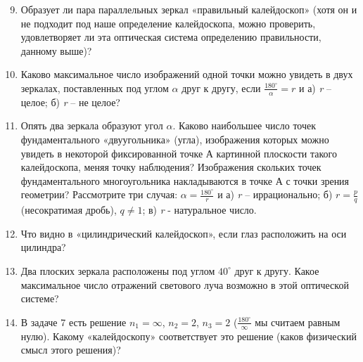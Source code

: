 \begin{minipage}{0.6\textwidth}
\begin{enumerate}
        \setcounter{enumi}{8}
        \item Образует ли пара параллельных зеркал «правильный калейдоскоп» (хотя он и не подходит под наше определение калейдоскопа, можно проверить, удовлетворяет ли эта оптическая система определению правильности, данному выше)?
        \item Каково максимальное число изображений одной точки можно увидеть в двух зеркалах, поставленных под углом $\alpha$ друг к другу, если $\frac{180^\circ}{\alpha} = r$ и а) \textit{r} -- целое; б) \textit{r} -- не целое?
        \item Опять два зеркала образуют угол $\alpha$. Каково наибольшее число точек фундаментального «двуугольника» (угла), изображения которых можно увидеть в некоторой фиксированной точке А картинной плоскости такого калейдоскопа, меняя точку наблюдения? Изображения скольких точек фундаментального многоугольника накладываются в точке А с точки зрения геометрии? Рассмотрите три случая: $\alpha = \frac{180^\circ}{r}$ и а) \textit{r} -- иррационально; б) $r= \frac{p}{q}$ (несократимая дробь), $q \neq 1$; в) \textit{r} - натуральное число.
        \item Что видно в «цилиндрический калейдоскоп», если глаз расположить на оси цилиндра?
        \item Два плоских зеркала расположены под углом $40^\circ$ друг к другу. Какое максимальное число отражений светового луча возможно в этой оптической системе?
        \item В задаче 7 есть решение $n_1 = \infty$, $n_2 = 2$, $n_3 = 2$ ($\frac{180^\circ}{\infty}$ мы считаем равным нулю). Какому «калейдоскопу» соответствует это решение (каков физический смысл этого решения)?
    \end{enumerate} 
\end{minipage}
\indent
